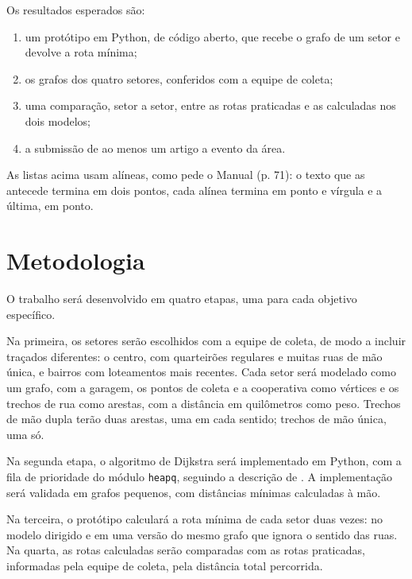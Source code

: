 \documentclass[diss-proposta]{texufpel}
\begin{document}
Os resultados esperados são:

\begin{enumerate}
  \item um protótipo em Python, de código aberto, que recebe o grafo de um
        setor e devolve a rota mínima;
  \item os grafos dos quatro setores, conferidos com a equipe de coleta;
  \item uma comparação, setor a setor, entre as rotas praticadas e as
        calculadas nos dois modelos;
  \item a submissão de ao menos um artigo a evento da área.
\end{enumerate}

As listas acima usam alíneas, como pede o Manual (p. 71): o texto que as
antecede termina em dois pontos, cada alínea termina em ponto e vírgula e a
última, em ponto.

\chapter{Metodologia}

O trabalho será desenvolvido em quatro etapas, uma para cada objetivo
específico.

Na primeira, os setores serão escolhidos com a equipe de coleta, de modo a
incluir traçados diferentes: o centro, com quarteirões regulares e muitas ruas
de mão única, e bairros com loteamentos mais recentes. Cada setor será
modelado como um grafo, com a garagem, os pontos de coleta e a cooperativa como
vértices e os trechos de rua como arestas, com a distância em quilômetros como
peso. Trechos de mão dupla terão duas arestas, uma em cada sentido; trechos de
mão única, uma só.

Na segunda etapa, o algoritmo de Dijkstra será implementado em Python, com a
fila de prioridade do módulo \texttt{heapq}, seguindo a descrição de
\citet{Cormen:2022:IA}. A implementação será validada em grafos pequenos, com
distâncias mínimas calculadas à mão.

Na terceira, o protótipo calculará a rota mínima de cada setor duas vezes: no
modelo dirigido e em uma versão do mesmo grafo que ignora o sentido das ruas.
Na quarta, as rotas calculadas serão comparadas com as rotas praticadas,
informadas pela equipe de coleta, pela distância total percorrida.
\end{document}
